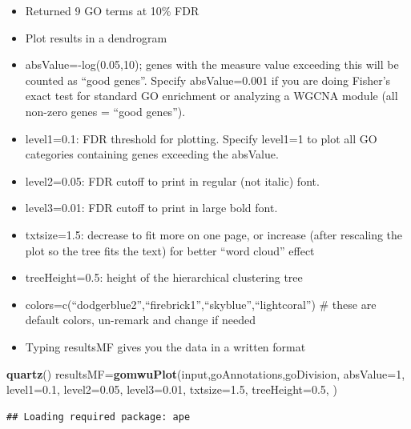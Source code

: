 \documentclass[
]{article}
\newenvironment{Shaded}{\begin{snugshade}}{\end{snugshade}}
\newcommand{\DataTypeTok}[1]{\textcolor[rgb]{0.13,0.29,0.53}{#1}}
\newcommand{\DecValTok}[1]{\textcolor[rgb]{0.00,0.00,0.81}{#1}}
\newcommand{\FloatTok}[1]{\textcolor[rgb]{0.00,0.00,0.81}{#1}}
\newcommand{\KeywordTok}[1]{\textcolor[rgb]{0.13,0.29,0.53}{\textbf{#1}}}
\newcommand{\NormalTok}[1]{#1}
\providecommand{\tightlist}{%
  \setlength{\itemsep}{0pt}\setlength{\parskip}{0pt}}
\begin{document}
\begin{itemize}
\tightlist
\item
  Returned 9 GO terms at 10\% FDR
\item
  Plot results in a dendrogram
\item
  absValue=-log(0.05,10); genes with the measure value exceeding this
  will be counted as ``good genes''. Specify absValue=0.001 if you are
  doing Fisher's exact test for standard GO enrichment or analyzing a
  WGCNA module (all non-zero genes = ``good genes'').
\item
  level1=0.1: FDR threshold for plotting. Specify level1=1 to plot all
  GO categories containing genes exceeding the absValue.
\item
  level2=0.05: FDR cutoff to print in regular (not italic) font.
\item
  level3=0.01: FDR cutoff to print in large bold font.
\item
  txtsize=1.5: decrease to fit more on one page, or increase (after
  rescaling the plot so the tree fits the text) for better ``word
  cloud'' effect
\item
  treeHeight=0.5: height of the hierarchical clustering tree
\item
  colors=c(``dodgerblue2'',``firebrick1'',``skyblue'',``lightcoral'') \#
  these are default colors, un-remark and change if needed
\item
  Typing resultsMF gives you the data in a written format
\end{itemize}

\begin{Shaded}
\begin{Highlighting}[]
\KeywordTok{quartz}\NormalTok{()}
\NormalTok{resultsMF=}\KeywordTok{gomwuPlot}\NormalTok{(input,goAnnotations,goDivision,}
                  \DataTypeTok{absValue=}\DecValTok{1}\NormalTok{,}
                  \DataTypeTok{level1=}\FloatTok{0.1}\NormalTok{,}
                  \DataTypeTok{level2=}\FloatTok{0.05}\NormalTok{,}
                  \DataTypeTok{level3=}\FloatTok{0.01}\NormalTok{,}
                  \DataTypeTok{txtsize=}\FloatTok{1.5}\NormalTok{,}
                  \DataTypeTok{treeHeight=}\FloatTok{0.5}\NormalTok{,}
\NormalTok{)}
\end{Highlighting}
\end{Shaded}

\begin{verbatim}
## Loading required package: ape
\end{verbatim}
\end{document}
